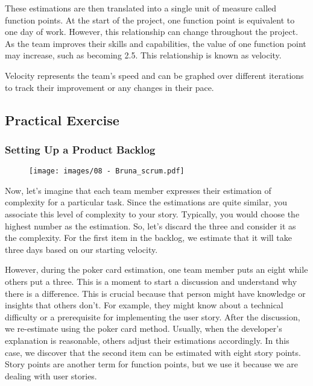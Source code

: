 These estimations are then translated into a single unit of measure
called function points. At the start of the project, one function point
is equivalent to one day of work. However, this relationship can change
throughout the project. As the team improves their skills and
capabilities, the value of one function point may increase, such as
becoming 2.5. This relationship is known as velocity.

Velocity represents the team's speed and can be graphed over different
iterations to track their improvement or any changes in their pace.

\subsection{Practical Exercise}

\subsubsection{Setting Up a Product Backlog}

\begin{figure}[!h]
  \centering
  \texttt{[image: images/08 - Bruna\_scrum.pdf]}
\end{figure}

Now, let's imagine that each team member expresses their estimation of
complexity for a particular task. Since the estimations are quite
similar, you associate this level of complexity to your story.
Typically, you would choose the highest number as the estimation. So,
let's discard the three and consider it as the complexity. For the first
item in the backlog, we estimate that it will take three days based on
our starting velocity.

However, during the poker card estimation, one team member puts an eight
while others put a three. This is a moment to start a discussion and
understand why there is a difference. This is crucial because that
person might have knowledge or insights that others don't. For example,
they might know about a technical difficulty or a prerequisite for
implementing the user story. After the discussion, we re-estimate using
the poker card method. Usually, when the developer's explanation is
reasonable, others adjust their estimations accordingly. In this case,
we discover that the second item can be estimated with eight story
points. Story points are another term for function points, but we use it
because we are dealing with user stories.

